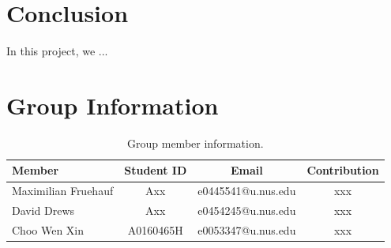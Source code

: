 \documentclass[11pt]{article}
\begin{document}
\section{Conclusion}
In this project, we ...

\section{Group Information}
\begin{table}[ht]
    \centering
    \begin{tabular}{lccc}
    \toprule
     Member & Student ID & Email & Contribution\\
    \midrule
    Maximilian Fruehauf& Axx & e0445541@u.nus.edu & xxx \\
    David Drews& Axx &e0454245@u.nus.edu & xxx  \\
    Choo Wen Xin& A0160465H & e0053347@u.nus.edu & xxx  \\
    \bottomrule
    \end{tabular}
    \caption{Group member information.}
    \label{tab:dataset}
\end{table}




 
\end{document}
